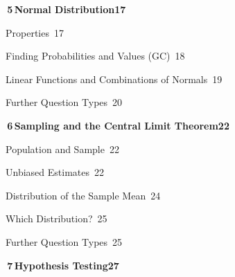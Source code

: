 {{\vspace{0.4mm}\noindent\colorbox{blue!8}{\parbox{\dimexpr\textwidth-2\fboxsep}{\large\bfseries\color{blue!50!black}\colorbox{blue!50!black}{\color{white}\,5\,}\quad Normal Distribution\hfill 17}}\par\vspace{0.3mm}
\noindent{}\quad Properties\dotfill\ 17\par
\noindent{}\quad Finding Probabilities and Values (GC)\dotfill\ 18\par
\noindent{}\quad Linear Functions and Combinations of Normals\dotfill\ 19\par
\noindent{}\quad Further Question Types\dotfill\ 20\par
\vspace{0.4mm}\noindent\colorbox{blue!8}{\parbox{\dimexpr\textwidth-2\fboxsep}{\large\bfseries\color{blue!50!black}\colorbox{blue!50!black}{\color{white}\,6\,}\quad Sampling and the Central Limit Theorem\hfill 22}}\par\vspace{0.3mm}
\noindent{}\quad Population and Sample\dotfill\ 22\par
\noindent{}\quad Unbiased Estimates\dotfill\ 22\par
\noindent{}\quad Distribution of the Sample Mean\dotfill\ 24\par
\noindent{}\quad Which Distribution?\dotfill\ 25\par
\noindent{}\quad Further Question Types\dotfill\ 25\par
\vspace{0.4mm}\noindent\colorbox{blue!8}{\parbox{\dimexpr\textwidth-2\fboxsep}{\large\bfseries\color{blue!50!black}\colorbox{blue!50!black}{\color{white}\,7\,}\quad Hypothesis Testing\hfill 27}}\par\vspace{0.3mm}
}}
